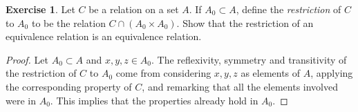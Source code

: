 \documentclass[11pt,a4paper,twoside]{article}
\theoremstyle{definition}
\newcounter{excounter}
\newtheorem{exercise}[excounter]{Exercise}
\begin{document}
\begin{exercise}

  Let $C$ be a relation on a set $A$. If $A_0 \subset A$, define the \emph{restriction} of $C$ to $A_0$ to be the relation $C \cap (A_0 \times A_0)$.
  Show that the restriction of an equivalence relation is an equivalence relation.

\end{exercise}

\begin{proof}\hfill

  Let $A_0 \subset A$ and $x, y, z \in A_0$. The reflexivity, symmetry and transitivity of the restriction of $C$ to $A_0$ come from considering
  $x, y, z$ as elements of $A$, applying the corresponding property of $C$, and remarking that all the elements involved were in $A_0$. This implies
  that the properties already hold in $A_0$.

\end{proof}
\end{document}
